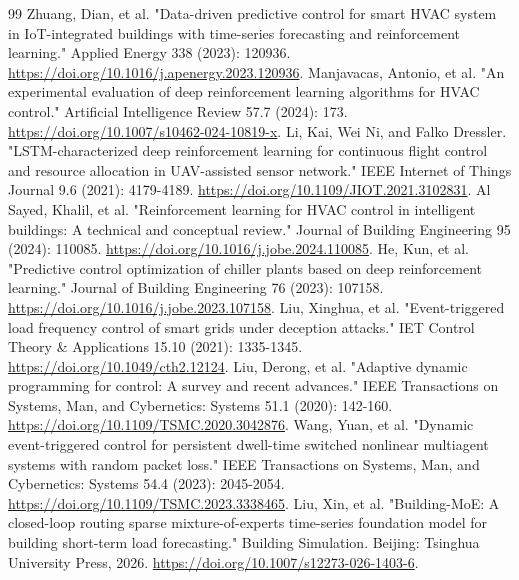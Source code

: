 \documentclass[preprint,12pt,number]{elsarticle}
\begin{document}
\begin{thebibliography}{99}
 Zhuang, Dian, et al. "Data-driven predictive control for smart HVAC system in IoT-integrated buildings with time-series forecasting and reinforcement learning." Applied Energy 338 (2023): 120936. \url{https://doi.org/10.1016/j.apenergy.2023.120936}.
 Manjavacas, Antonio, et al. "An experimental evaluation of deep reinforcement learning algorithms for HVAC control." Artificial Intelligence Review 57.7 (2024): 173. \url{https://doi.org/10.1007/s10462-024-10819-x}.
 Li, Kai, Wei Ni, and Falko Dressler. "LSTM-characterized deep reinforcement learning for continuous flight control and resource allocation in UAV-assisted sensor network." IEEE Internet of Things Journal 9.6 (2021): 4179-4189. \url{https://doi.org/10.1109/JIOT.2021.3102831}.
 Al Sayed, Khalil, et al. "Reinforcement learning for HVAC control in intelligent buildings: A technical and conceptual review." Journal of Building Engineering 95 (2024): 110085. \url{https://doi.org/10.1016/j.jobe.2024.110085}.
 He, Kun, et al. "Predictive control optimization of chiller plants based on deep reinforcement learning." Journal of Building Engineering 76 (2023): 107158. \url{https://doi.org/10.1016/j.jobe.2023.107158}.
 Liu, Xinghua, et al. "Event-triggered load frequency control of smart grids under deception attacks." IET Control Theory \& Applications 15.10 (2021): 1335-1345. \url{https://doi.org/10.1049/cth2.12124}.
 Liu, Derong, et al. "Adaptive dynamic programming for control: A survey and recent advances." IEEE Transactions on Systems, Man, and Cybernetics: Systems 51.1 (2020): 142-160. \url{https://doi.org/10.1109/TSMC.2020.3042876}.
 Wang, Yuan, et al. "Dynamic event-triggered control for persistent dwell-time switched nonlinear multiagent systems with random packet loss." IEEE Transactions on Systems, Man, and Cybernetics: Systems 54.4 (2023): 2045-2054. \url{https://doi.org/10.1109/TSMC.2023.3338465}.
 Liu, Xin, et al. "Building-MoE: A closed-loop routing sparse mixture-of-experts time-series foundation model for building short-term load forecasting." Building Simulation. Beijing: Tsinghua University Press, 2026. \url{https://doi.org/10.1007/s12273-026-1403-6}.
\end{thebibliography}
\end{document}

